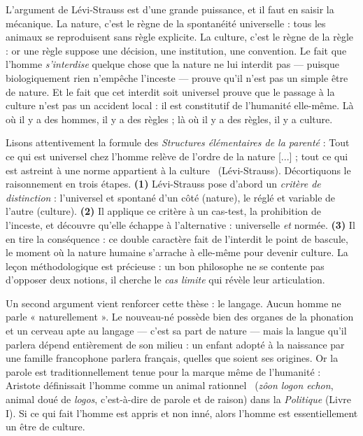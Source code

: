 \documentclass[11pt]{article}
\newcommand{\cle}[1]{{\popxbold\color{popdark}#1}}
\begin{document}
L'argument de Lévi-Strauss est d'une grande puissance, et il faut en saisir la mécanique. La nature, c'est le règne de la spontanéité universelle : tous les animaux se reproduisent sans règle explicite. La culture, c'est le règne de la règle : or une règle suppose une décision, une institution, une convention. Le fait que l'homme \emph{s'interdise} quelque chose que la nature ne lui interdit pas — puisque biologiquement rien n'empêche l'inceste — prouve qu'il n'est pas un simple être de nature. Et le fait que cet interdit soit universel prouve que le passage à la culture n'est pas un accident local : il est constitutif de l'humanité elle-même. Là où il y a des hommes, il y a des règles ; là où il y a des règles, il y a culture.

\begin{experience}
Lisons attentivement la formule des \emph{Structures élémentaires de la parenté} : \guillemotleft Tout ce qui est universel chez l'homme relève de l'ordre de la nature [...] ; tout ce qui est astreint à une norme appartient à la culture \guillemotright\ (Lévi-Strauss). Décortiquons le raisonnement en trois étapes. \textbf{(1)} Lévi-Strauss pose d'abord un \emph{critère de distinction} : l'universel et spontané d'un côté (nature), le réglé et variable de l'autre (culture). \textbf{(2)} Il applique ce critère à un cas-test, la prohibition de l'inceste, et découvre qu'elle échappe à l'alternative : universelle \emph{et} normée. \textbf{(3)} Il en tire la conséquence : ce double caractère fait de l'interdit le point de bascule, le moment où la nature humaine s'arrache à elle-même pour devenir culture. La leçon méthodologique est précieuse : un bon philosophe ne se contente pas d'opposer deux notions, il cherche le \emph{cas limite} qui révèle leur articulation.
\end{experience}

Un second argument vient renforcer cette thèse : le \cle{langage}. Aucun homme ne parle « naturellement ». Le nouveau-né possède bien des organes de la phonation et un cerveau apte au langage — c'est sa part de nature — mais la langue qu'il parlera dépend entièrement de son milieu : un enfant adopté à la naissance par une famille francophone parlera français, quelles que soient ses origines. Or la parole est traditionnellement tenue pour la marque même de l'humanité : Aristote définissait l'homme comme un \guillemotleft animal rationnel \guillemotright\ (\emph{zôon logon echon}, animal doué de \emph{logos}, c'est-à-dire de parole et de raison) dans la \emph{Politique} (Livre I). Si ce qui fait l'homme est appris et non inné, alors l'homme est essentiellement un être de culture.
\end{document}
